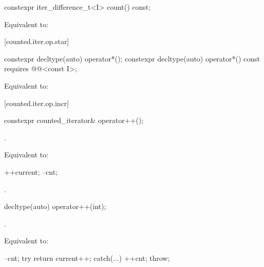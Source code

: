 \begin{addedblock}
%
%
\begin{itemdecl}
constexpr iter_difference_t<I> count() const;
\end{itemdecl}

\begin{itemdescr}
\pnum
\effects Equivalent to: 
\end{itemdescr}

[counted.iter.op.star]{}

%
%
\begin{itemdecl}
constexpr decltype(auto) operator*();
constexpr decltype(auto) operator*() const
  requires @@<const I>;
\end{itemdecl}

\begin{itemdescr}
\pnum
\effects Equivalent to: 
\end{itemdescr}

[counted.iter.op.incr]{}

%
%
\begin{itemdecl}
constexpr counted_iterator& operator++();
\end{itemdecl}

\begin{itemdescr}
\pnum
\expects {}.

\pnum
\effects Equivalent to:
\begin{codeblock}
++current;
--cnt;
\end{codeblock}

\pnum
\returns {}.
\end{itemdescr}

%
%
\begin{itemdecl}
decltype(auto) operator++(int);
\end{itemdecl}

\begin{itemdescr}
\pnum
\expects {}.

\pnum
\effects Equivalent to:
\begin{codeblock}
--cnt;
try { return current++; }
catch(...) { ++cnt; throw; }
\end{codeblock}
\end{itemdescr}


\end{addedblock}
